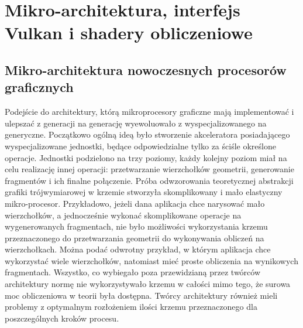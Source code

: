 \chapter{Mikro-architektura, interfejs Vulkan i shadery obliczeniowe}
\label{cha:vulkan_micro_shaders}

\section{Mikro-architektura nowoczesnych procesorów graficznych}
\label{sec:micro}

Podejście do architektury, którą mikroprocesory graficzne mają implementować i ulepszać z generacji na generację wyewoluowało z wyspecjalizowanego na generyczne.
Początkowo ogólną ideą było stworzenie akceleratora posiadającego wyspecjalizowane jednostki, będące odpowiedzialne tylko za ściśle określone operacje.
Jednostki podzielono na trzy poziomy, każdy kolejny poziom miał na celu realizację innej operacji: przetwarzanie wierzchołków geometrii, generowanie fragmentów i ich finalne połączenie.
Próba odwzorowania teoretycznej abstrakcji grafiki trójwymiarowej w krzemie stworzyła skomplikowany i mało elastyczny mikro-procesor.
Przykładowo, jeżeli dana aplikacja chce narysować mało wierzchołków, a jednocześnie wykonać skomplikowane operacje na wygenerowanych fragmentach, nie było możliwości wykorzystania krzemu przeznaczonego do przetwarzania geometrii do wykonywania obliczeń na wierzchołkach.
Można podać odwrotny przykład, w którym aplikacja chce wykorzystać wiele wierzchołków, natomiast mieć proste obliczenia na wynikowych fragmentach.
Wszystko, co wybiegało poza przewidzianą przez twórców architektury normę nie wykorzystywało krzemu w całości mimo tego, że surowa moc obliczeniowa w teorii była dostępna.
Twórcy architektury również mieli problemy z optymalnym rozłożeniem ilości krzemu przeznaczonego dla poszczególnych kroków procesu. 

